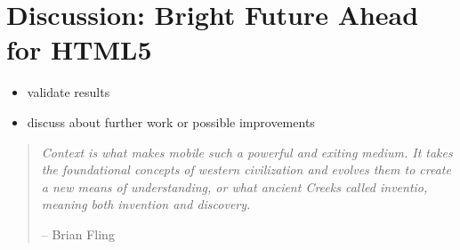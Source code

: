 \chapter{Discussion: Bright Future Ahead for HTML5}
\label{chapter:discussion}

\begin{itemize}
\item validate results
\item discuss about further work or possible improvements
\end{itemize}

\begin{quotation}
  \noindent \textit{Context  is what makes mobile such  a powerful and
    exiting  medium. It  takes  the foundational  concepts of  western
    civilization  and   evolves  them  to   create  a  new   means  of
    understanding,  or what  ancient Creeks  called  inventio, meaning
    both invention and discovery.}
  \begin{flushright}
    -- Brian Fling \cite{fling2009mobile}
  \end{flushright}
\end{quotation}
